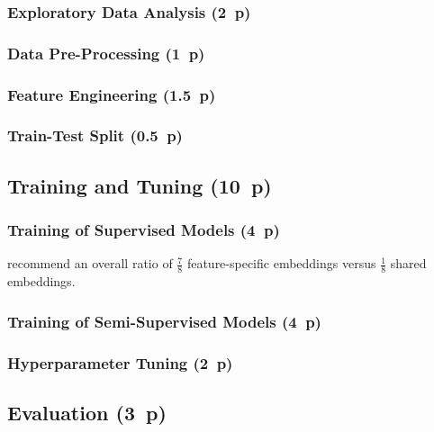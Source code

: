 \subsubsection{Exploratory Data Analysis (2~p)}\label{sec:exploratory-data-analysis}

\subsubsection{Data Pre-Processing (1~p)}\label{sec:data-preprocessing}

\subsubsection{Feature Engineering (1.5~p)}\label{sec:feature-engineering}

\subsubsection{Train-Test Split (0.5~p)}\label{sec:train-test-split}

\subsection{Training and Tuning (10~p)}\label{sec:training-and-tuning}

\subsubsection{Training of Supervised
  Models (4~p)}\label{sec:training-of-supervised-models}

\textcite[][12]{huangTabTransformerTabularData2020} recommend an overall ratio of $\tfrac{7}{8}$ feature-specific embeddings versus $\tfrac{1}{8}$ shared embeddings.

\subsubsection{Training of Semi-Supervised
  Models (4~p)}\label{sec:training-of-semi-supervised-models}


\subsubsection{Hyperparameter Tuning (2~p)}\label{sec:hyperparameter-tuning}


\subsection{Evaluation (3~p)}\label{sec:evaluation}

